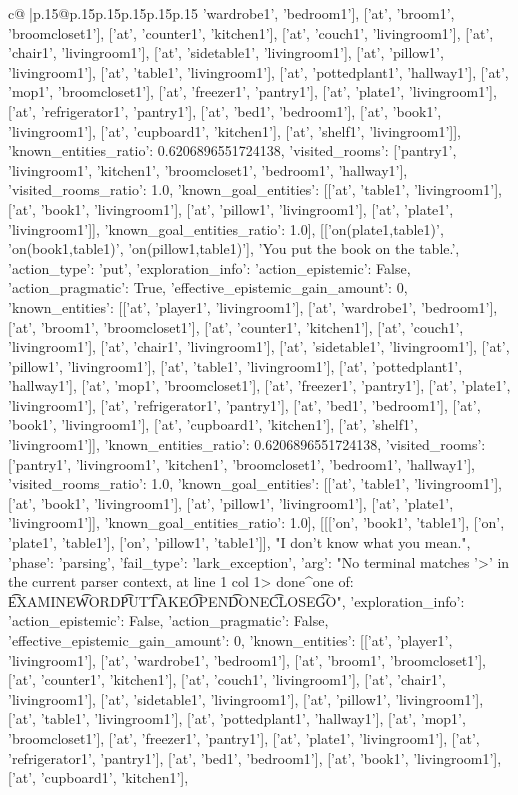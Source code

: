 \documentclass{article}
\begin{document}
{\begin{supertabular}{c@{$\;$}|p{.15\linewidth}@{}p{.15\linewidth}p{.15\linewidth}p{.15\linewidth}p{.15\linewidth}p{.15\linewidth}}
{{{'wardrobe1', 'bedroom1'], ['at', 'broom1', 'broomcloset1'], ['at', 'counter1', 'kitchen1'], ['at', 'couch1', 'livingroom1'], ['at', 'chair1', 'livingroom1'], ['at', 'sidetable1', 'livingroom1'], ['at', 'pillow1', 'livingroom1'], ['at', 'table1', 'livingroom1'], ['at', 'pottedplant1', 'hallway1'], ['at', 'mop1', 'broomcloset1'], ['at', 'freezer1', 'pantry1'], ['at', 'plate1', 'livingroom1'], ['at', 'refrigerator1', 'pantry1'], ['at', 'bed1', 'bedroom1'], ['at', 'book1', 'livingroom1'], ['at', 'cupboard1', 'kitchen1'], ['at', 'shelf1', 'livingroom1']], 'known_entities_ratio': 0.6206896551724138, 'visited_rooms': ['pantry1', 'livingroom1', 'kitchen1', 'broomcloset1', 'bedroom1', 'hallway1'], 'visited_rooms_ratio': 1.0, 'known_goal_entities': [['at', 'table1', 'livingroom1'], ['at', 'book1', 'livingroom1'], ['at', 'pillow1', 'livingroom1'], ['at', 'plate1', 'livingroom1']], 'known_goal_entities_ratio': 1.0}}], [['on(plate1,table1)', 'on(book1,table1)', 'on(pillow1,table1)'], 'You put the book on the table.', {'action_type': 'put', 'exploration_info': {'action_epistemic': False, 'action_pragmatic': True, 'effective_epistemic_gain_amount': 0, 'known_entities': [['at', 'player1', 'livingroom1'], ['at', 'wardrobe1', 'bedroom1'], ['at', 'broom1', 'broomcloset1'], ['at', 'counter1', 'kitchen1'], ['at', 'couch1', 'livingroom1'], ['at', 'chair1', 'livingroom1'], ['at', 'sidetable1', 'livingroom1'], ['at', 'pillow1', 'livingroom1'], ['at', 'table1', 'livingroom1'], ['at', 'pottedplant1', 'hallway1'], ['at', 'mop1', 'broomcloset1'], ['at', 'freezer1', 'pantry1'], ['at', 'plate1', 'livingroom1'], ['at', 'refrigerator1', 'pantry1'], ['at', 'bed1', 'bedroom1'], ['at', 'book1', 'livingroom1'], ['at', 'cupboard1', 'kitchen1'], ['at', 'shelf1', 'livingroom1']], 'known_entities_ratio': 0.6206896551724138, 'visited_rooms': ['pantry1', 'livingroom1', 'kitchen1', 'broomcloset1', 'bedroom1', 'hallway1'], 'visited_rooms_ratio': 1.0, 'known_goal_entities': [['at', 'table1', 'livingroom1'], ['at', 'book1', 'livingroom1'], ['at', 'pillow1', 'livingroom1'], ['at', 'plate1', 'livingroom1']], 'known_goal_entities_ratio': 1.0}}], [[['on', 'book1', 'table1'], ['on', 'plate1', 'table1'], ['on', 'pillow1', 'table1']], "I don't know what you mean.", {'phase': 'parsing', 'fail_type': 'lark_exception', 'arg': "No terminal matches '>' in the current parser context, at line 1 col 1\n\n> done\n^\nExpected one of: \n\t* EXAMINE\n\t* WORD\n\t* PUT\n\t* TAKE\n\t* OPEN\n\t* DONE\n\t* CLOSE\n\t* GO\n", 'exploration_info': {'action_epistemic': False, 'action_pragmatic': False, 'effective_epistemic_gain_amount': 0, 'known_entities': [['at', 'player1', 'livingroom1'], ['at', 'wardrobe1', 'bedroom1'], ['at', 'broom1', 'broomcloset1'], ['at', 'counter1', 'kitchen1'], ['at', 'couch1', 'livingroom1'], ['at', 'chair1', 'livingroom1'], ['at', 'sidetable1', 'livingroom1'], ['at', 'pillow1', 'livingroom1'], ['at', 'table1', 'livingroom1'], ['at', 'pottedplant1', 'hallway1'], ['at', 'mop1', 'broomcloset1'], ['at', 'freezer1', 'pantry1'], ['at', 'plate1', 'livingroom1'], ['at', 'refrigerator1', 'pantry1'], ['at', 'bed1', 'bedroom1'], ['at', 'book1', 'livingroom1'], ['at', 'cupboard1', 'kitchen1'], }}}
\end{supertabular}}
\end{document}
